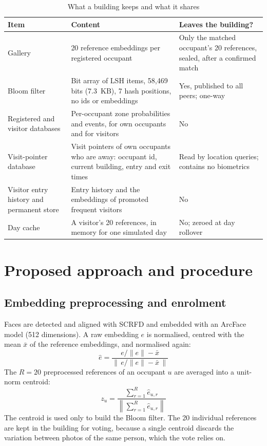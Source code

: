 \documentclass[12pt,a4paper,oneside]{report}
\begin{document}
\begin{table}[htbp]
\centering
\caption{What a building keeps and what it shares}\label{tab:stores}
{\small\setlength{\tabcolsep}{4pt}\renewcommand{\arraystretch}{1.2}
\begin{tabular}{|p{3.52cm}|p{6.06cm}|p{4.69cm}|}\hline
\textbf{Item} & \textbf{Content} & \textbf{Leaves the building?}\\\hline
Gallery & 20 reference embeddings per registered occupant & Only the matched occupant's 20 references, sealed, after a confirmed match\\\hline
Bloom filter & Bit array of LSH items, 58,469 bits (7.3~KB), 7 hash positions, no ids or embeddings & Yes, published to all peers; one-way\\\hline
Registered and visitor databases & Per-occupant zone probabilities and events, for own occupants and for visitors & No\\\hline
Visit-pointer database & Visit pointers of own occupants who are away: occupant id, current building, entry and exit times & Read by location queries; contains no biometrics\\\hline
Visitor entry history and permanent store & Entry history and the embeddings of promoted frequent visitors & No\\\hline
Day cache & A visitor's 20 references, in memory for one simulated day & No; zeroed at day rollover\\\hline
\end{tabular}}
\end{table}


\section{Proposed approach and procedure}
\subsection{Embedding preprocessing and enrolment}
Faces are detected and aligned with SCRFD \cite{ref18} and embedded with an ArcFace model \cite{ref17} (512 dimensions). A raw embedding $e$ is normalised, centred with the mean $\bar{x}$ of the reference embeddings, and normalised again:
\begin{equation}\label{eq:norm}
\hat{e}=\frac{e/\|e\|-\bar{x}}{\left\|\,e/\|e\|-\bar{x}\,\right\|}
\end{equation}
The $R=20$ preprocessed references of an occupant $u$ are averaged into a unit-norm centroid:
\begin{equation}\label{eq:centroid}
z_u=\frac{\sum_{r=1}^{R}\hat{e}_{u,r}}{\left\|\sum_{r=1}^{R}\hat{e}_{u,r}\right\|}
\end{equation}
The centroid is used only to build the Bloom filter. The 20 individual references are kept in the building for voting, because a single centroid discards the variation between photos of the same person, which the vote relies on.
\end{document}
